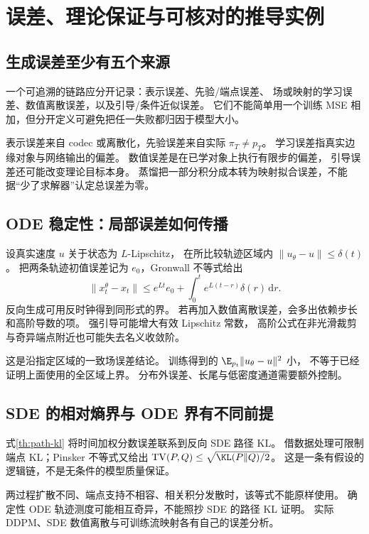 \chapter{误差、理论保证与可核对的推导实例}
\label{th:guarantees}

\section{生成误差至少有五个来源}

一个可追溯的链路应分开记录：表示误差、先验/端点误差、
场或映射的学习误差、数值离散误差，以及引导/条件近似误差。
它们不能简单用一个训练 MSE 相加，但分开定义可避免把任一失败都归因于模型大小。

表示误差来自 codec 或离散化，先验误差来自实际 $\pi_T\ne p_T$。
学习误差指真实边缘对象与网络输出的偏差。
数值误差是在已学对象上执行有限步的偏差，
引导误差还可能改变理论目标本身。
蒸馏把一部分积分成本转为映射拟合误差，不能据“少了求解器”认定总误差为零。

\section{ODE 稳定性：局部误差如何传播}

设真实速度 $u$ 关于状态为 $L$-Lipschitz，
在所比较轨迹区域内 $\|u_\theta-u\|\leq\delta(t)$。
把两条轨迹初值误差记为 $e_0$，Gronwall 不等式给出
\begin{equation}\label{th:gronwall}
\|x_t^\theta-x_t\|\leq e^{Lt}e_0+
 \int_0^t e^{L(t-r)}\delta(r)\,\mathrm dr.
\end{equation}
反向生成可用反时钟得到同形式的界。
若再加入数值离散误差，会多出依赖步长和高阶导数的项。
强引导可能增大有效 Lipschitz 常数，
高阶公式在非光滑裁剪与奇异端点附近也可能失去名义收敛阶。

这是沿指定区域的一致场误差结论。
训练得到的 $\E_{p_t}\|u_\theta-u\|^2$ 小，
不等于已经证明上面使用的全区域上界。
分布外误差、长尾与低密度通道需要额外控制。

\section{SDE 的相对熵界与 ODE 界有不同前提}

式\eqref{th:path-kl} 将时间加权分数误差联系到反向 SDE 路径 KL。
借数据处理可限制端点 KL；Pinsker 不等式又给出
$\mathrm{TV}(P,Q)\leq\sqrt{\KL(P\Vert Q)/2}$。
这是一条有假设的逻辑链，不是无条件的模型质量保证。

两过程扩散不同、端点支持不相容、相关积分发散时，该等式不能原样使用。
确定性 ODE 轨迹测度可能相互奇异，不能照抄 SDE 的路径 KL 证明。
实际 DDPM、SDE 数值离散与可训练流映射各有自己的误差分析。

